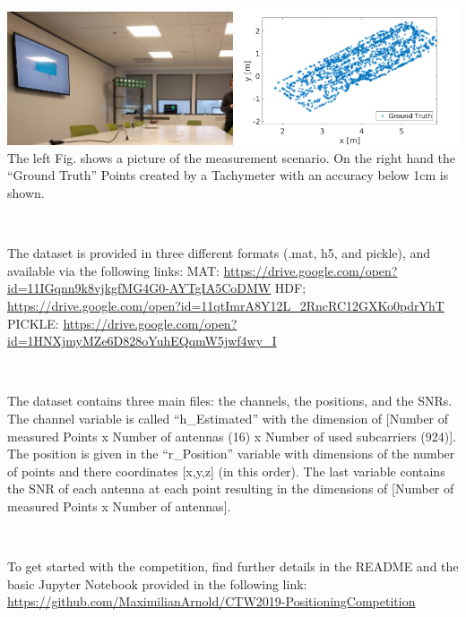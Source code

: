 \documentclass[letter]{moderncv} %
\begin{document}
\includegraphics[width=0.5\textwidth]{ParisEnvironment}\includegraphics[width=0.5\textwidth]{IndoorDataset}
The left Fig. shows a picture of the measurement scenario. On the right hand the ``Ground Truth'' Points created by a Tachymeter with an accuracy below 1cm is shown.
\vspace{4ex}


~

The dataset is provided in three different formats (.mat, h5, and pickle), and    available via the following links: \newline
  MAT:    \url{https://drive.google.com/open?id=11IGqnn9k8vjkgfMG4G0-AYTgIA5CoDMW} \newline
  HDF;    \url{https://drive.google.com/open?id=11qtImrA8Y12L_2RncRC12GXKo0pdrYhT} \newline
  PICKLE: \url{https://drive.google.com/open?id=1HNXjmyMZe6D828oYuhEQqmW5jwf4wy_I} \newline

~

The dataset contains three main files: the channels, the positions, and the SNRs. The channel variable is called ``h\_Estimated'' with the dimension of [Number of measured Points x Number of antennas (16) x Number of used subcarriers (924)]. The position is given in the ``r\_Position'' variable with dimensions of the number of points  and there coordinates [x,y,z] (in this order). The last variable contains the SNR of each antenna at each point resulting in the dimensions 
of [Number of measured Points x Number of antennas].

~


To get started with the competition, find further details in the README and the basic Jupyter Notebook provided in the following link:\newline
\url{https://github.com/MaximilianArnold/CTW2019-PositioningCompetition}
\end{document}
